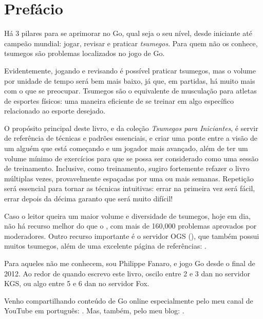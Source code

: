 \chapter{Prefácio}

\small
  
Há 3 pilares para se aprimorar no Go, qual seja o seu nível, desde iniciante até campeão mundial: jogar, revisar e praticar \emph{tsumegos}. Para quem não os conhece, tsumegos são problemas localizados no jogo de Go.

Evidentemente, jogando e revisando é possível praticar tsumegos, mas o volume por unidade de tempo será bem mais baixo, já que, em partidas, há muito mais com o que se preocupar. Tsumegos são o equivalente de musculação para atletas de esportes físicos: uma maneira eficiente de se treinar em algo específico relacionado ao esporte desejado.

O propósito principal deste livro, e da coleção \emph{Tsumegos para Iniciantes}, é servir de referência de técnicas e padrões essenciais, e criar uma ponte entre a visão de um alguém que está começando e um jogador mais avançado, além de ter um volume mínimo de exercícios para que se possa ser considerado como uma sessão de treinamento. Inclusive, como treinamento, sugiro fortemente refazer o livro múltiplas vezes, provavelmente espaçadas por uma ou mais semanas. Repetição será essencial para tornar as técnicas intuitivas: errar na primeira vez será fácil, errar depois da décima garanto que será muito difícil!

Caso o leitor queira um maior volume e diversidade de tsumegos, hoje em dia, não há recurso melhor do que o , com mais de 160,000 problemas aprovados por moderadores. Outro recurso importante é o servidor OGS (), que também possui muitos tsumegos, além de uma excelente página de referências: .

\bigskip

Para aqueles não me conhecem, sou Philippe Fanaro, e jogo Go desde o final de 2012. Ao redor de quando escrevo este livro, oscilo entre 2 e 3 dan no servidor KGS, ou algo entre 5 e 6 dan no servidor Fox.

Venho compartilhando conteúdo de Go online especialmente pelo meu canal de YouTube em português: . Mas, também, pelo meu blog: .

